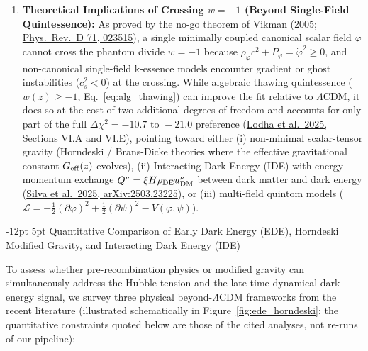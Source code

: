\documentclass[11pt,letterpaper]{article}
\makeatletter
\renewcommand{\subsection}{\@startsection{subsection}{2}{\z@}%
  {-12pt \@plus -3pt \@minus -1pt}%
  {5pt \@plus 1pt}%
  {\normalfont\large\bfseries\color{tealaccent}}}
\makeatother
\begin{document}
\begin{enumerate}
    \item \textbf{Theoretical Implications of Crossing $w = -1$ (Beyond Single-Field Quintessence):} As proved by the no-go theorem of Vikman (2005; \href{https://arxiv.org/abs/astro-ph/0407107}{Phys.\ Rev.\ D 71, 023515}), a single minimally coupled canonical scalar field $\varphi$ cannot cross the phantom divide $w = -1$ because $\rho_\varphi c^2 + P_\varphi = \dot{\varphi}^2 \ge 0$, and non-canonical single-field k-essence models encounter gradient or ghost instabilities ($c_s^2 < 0$) at the crossing. While algebraic thawing quintessence ($w(z) \ge -1$, Eq.~\ref{eq:alg_thawing}) can improve the fit relative to $\Lambda$CDM, it does so at the cost of two additional degrees of freedom and accounts for only part of the full $\Delta\chi^2 = -10.7\text{ to }-21.0$ preference (\href{https://arxiv.org/abs/2503.14743}{Lodha et al.\ 2025, Sections VI.A and VI.E}), pointing toward either (i) non-minimal scalar-tensor gravity (Horndeski / Brans-Dicke theories where the effective gravitational constant $G_{\rm eff}(z)$ evolves), (ii) Interacting Dark Energy (IDE) with energy-momentum exchange $Q^\nu = \xi H \rho_{\rm DE} u^\nu_{\rm DM}$ between dark matter and dark energy (\href{https://arxiv.org/abs/2503.23225}{Silva et al.\ 2025, arXiv:2503.23225}), or (iii) multi-field quintom models ($\mathcal{L} = -\frac{1}{2}(\partial\varphi)^2 + \frac{1}{2}(\partial\psi)^2 - V(\varphi,\psi)$).
\end{enumerate}


\subsection{Quantitative Comparison of Early Dark Energy (EDE), Horndeski Modified Gravity, and Interacting Dark Energy (IDE)}

To assess whether pre-recombination physics or modified gravity can simultaneously address the Hubble tension and the late-time dynamical dark energy signal, we survey three physical beyond-$\Lambda$CDM frameworks from the recent literature (illustrated schematically in Figure~\ref{fig:ede_horndeski}; the quantitative constraints quoted below are those of the cited analyses, not re-runs of our pipeline):
\end{document}
